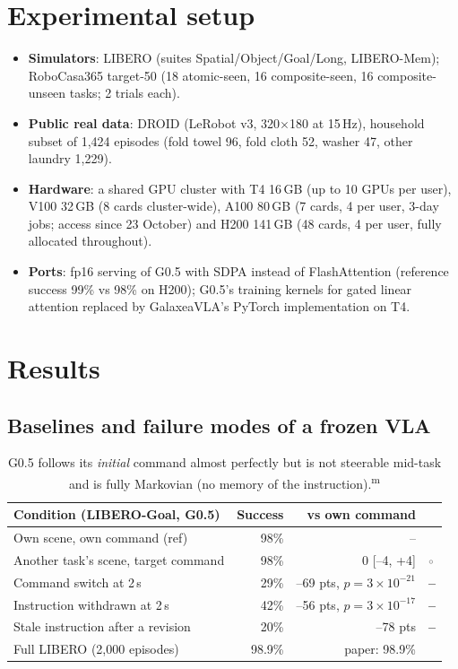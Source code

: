 \documentclass[10pt,a4paper]{article}
\DeclareRobustCommand{\meas}{\textsuperscript{\textcolor{green!50!black}{m}}}
\newcommand{\negr}{\textcolor{red!70!black}{\textbf{--}}}
\newcommand{\neu}{\textcolor{gray}{$\circ$}}
\begin{document}
\section{Experimental setup}
\label{sec:setup}
\begin{itemize}
\item \textbf{Simulators}: LIBERO (suites Spatial/Object/Goal/Long, LIBERO-Mem); RoboCasa365 target-50 (18 atomic-seen, 16 composite-seen, 16 composite-unseen tasks; 2 trials each).
\item \textbf{Public real data}: DROID (LeRobot v3, 320$\times$180 at 15\,Hz), household subset of 1,424 episodes (fold towel 96, fold cloth 52, washer 47, other laundry 1,229).
\item \textbf{Hardware}: a shared GPU cluster with T4 16\,GB (up to 10 GPUs per user), V100 32\,GB (8 cards cluster-wide), A100 80\,GB (7 cards, 4 per user, 3-day jobs; access since 23 October) and H200 141\,GB (48 cards, 4 per user, fully allocated throughout).
\item \textbf{Ports}: fp16 serving of G0.5 with SDPA instead of FlashAttention (reference success 99\% vs 98\% on H200); G0.5's training kernels for gated linear attention replaced by GalaxeaVLA's PyTorch implementation on T4.
\end{itemize}

\section{Results}
\label{sec:results}

\subsection{Baselines and failure modes of a frozen VLA}
\begin{table}[H]\centering\small
\begin{tabular}{lrrl}
\toprule
Condition (LIBERO-Goal, G0.5) & Success & vs own command & \\
\midrule
Own scene, own command (ref) & 98\% & -- & \\
Another task's scene, target command & 98\% & 0 [--4, +4] & \neu \\
Command switch at 2\,s & 29\% & --69 pts, $p=3\times10^{-21}$ & \negr \\
Instruction withdrawn at 2\,s & 42\% & --56 pts, $p=3\times10^{-17}$ & \negr \\
Stale instruction after a revision & 20\% & --78 pts & \negr \\
\midrule
Full LIBERO (2,000 episodes) & 98.9\% & paper: 98.9\% & \\
\bottomrule
\end{tabular}
\caption{G0.5 follows its \emph{initial} command almost perfectly but is not steerable mid-task and is fully Markovian (no memory of the instruction).\meas}
\end{table}
\end{document}
